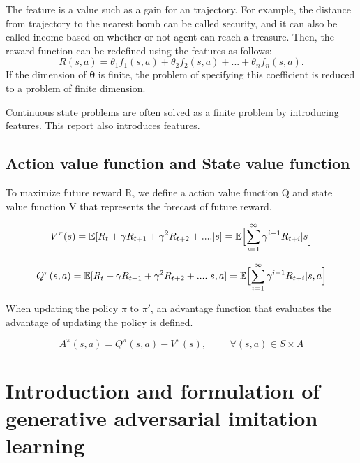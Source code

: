 The feature is a value such as a gain for an trajectory. For example, the distance from trajectory to the nearest bomb can be called security, and it can also be called income based on whether or not agent can reach a treasure.
Then, the reward function can be redefined using the features as follows:
\[
R(s,a) = \theta_1 f_1(s,a) + \theta_2 f_2(s,a) + ... + \theta_n f_n(s,a).
\]
If the dimension of ${\bm \theta}$ is finite, the problem of specifying this coefficient is reduced to a problem of finite dimension.

Continuous state problems are often solved as a finite problem by introducing features. This report also introduces features.


\subsection{Action value function and State value function}

To maximize future reward R, we define a action value function Q and state value function V that represents the forecast of future reward.

\[
V^{\pi}(s) = \mathbb{E}[R_{t} + \gamma R_{t+1} + \gamma^{2} R_{t+2}  + ....|s] = \mathbb{E} \Bigl[ \sum_{i=1}^{\infty} \gamma ^{i-1} R_{t+i} |s \Bigr]
\]

\[
Q^{\pi}(s,a) = \mathbb{E}[R_{t} + \gamma R_{t+1} + \gamma^{2} R_{t+2}  + ....|s,a] = \mathbb{E} \Bigl[ \sum_{i=1}^{\infty} \gamma ^{i-1} R_{t+i} |s,a \Bigr]
\]

When updating the policy $\pi$ to $\pi′$, an advantage function that evaluates the advantage of updating the policy is defined.

\[
A^{\pi}(s,a) = Q^{\pi}(s,a) - V^{\pi}(s), \hspace{1cm} \forall (s,a) \in S \times A 
\]



\section{Introduction and formulation of generative adversarial imitation learning}

